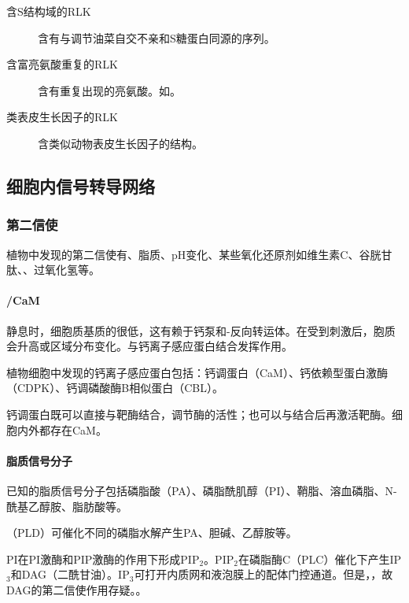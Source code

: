 \begin{description}
	\item[含S结构域的RLK] 含有与调节油菜自交不亲和S糖蛋白同源的序列。
	\item[含富亮氨酸重复的RLK] 含有重复出现的亮氨酸。如。
	\item[类表皮生长因子的RLK] 含类似动物表皮生长因子的结构。
\end{description}

\subsection{细胞内信号转导网络}

\subsubsection{第二信使}

植物中发现的第二信使有、脂质、pH变化、某些氧化还原剂如维生素C、谷胱甘肽、、过氧化氢等。

\paragraph{/CaM}

静息时，细胞质基质的很低，这有赖于钙泵和-反向转运体。在受到刺激后，胞质会升高或区域分布变化。与钙离子感应蛋白结合发挥作用。

植物细胞中发现的钙离子感应蛋白包括：钙调蛋白（CaM）、钙依赖型蛋白激酶（CDPK）、钙调磷酸酶B相似蛋白（CBL）。

钙调蛋白既可以直接与靶酶结合，调节酶的活性；也可以与结合后再激活靶酶。细胞内外都存在CaM。

\paragraph{脂质信号分子}

已知的脂质信号分子包括磷脂酸（PA）、磷脂酰肌醇（PI）、鞘脂、溶血磷脂、N-酰基乙醇胺、脂肪酸等。

（PLD）可催化不同的磷脂水解产生PA、胆碱、乙醇胺等。

PI在PI激酶和PIP激酶的作用下形成PIP$_{2}$。PIP$_{2}$在磷脂酶C（PLC）催化下产生IP$_{3}$和DAG（二酰甘油）。IP$_{3}$可打开内质网和液泡膜上的配体门控通道。但是，，故DAG的第二信使作用存疑。。

